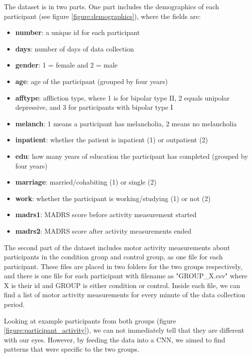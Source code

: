 The dataset is in two parts. One part includes the demographics of each participant (see figure \ref{figure:demographics}), where the fields are:

\begin{itemize}
    \item \textbf{number}: a unique id for each participant
    \item \textbf{days}: number of days of data collection 
    \item \textbf{gender}: 1 = female and 2 = male
    \item \textbf{age}: age of the participant (grouped by four years)
    \item \textbf{afftype}: affliction type, where 1 is for bipolar type II, 2 equals unipolar depressive, and 3 for participants with bipolar type I
    \item \textbf{melanch}: 1 means a participant has melancholia, 2 means no melancholia
    \item \textbf{inpatient}: whether the patient is inpatient (1) or outpatient (2)
    \item \textbf{edu}: how many years of education the participant has completed (grouped by four years)
    \item \textbf{marriage}: married/cohabiting (1) or single (2)
    \item \textbf{work}: whether the participant is working/studying (1) or not (2)
    \item \textbf{madrs1}: MADRS score before activity measurement started
    \item \textbf{madrs2}: MADRS score after activity measurements ended
\end{itemize}

The second part of the dataset includes motor activity measurements about participants in the condition group and control group, as one file for each participant. These files are placed in two folders for the two groups respectively, and there is one file for each participant with filename as "GROUP\_X.csv" where X is their id and GROUP is either condition or control. Inside each file, we can find a list of motor activity measurements for every minute of the data collection period.

Looking at example participants from both groups (figure \ref{figure:participant_activity}), we can not immediately tell that they are different with our eyes. However, by feeding the data into a CNN, we aimed to find patterns that were specific to the two groups. 

